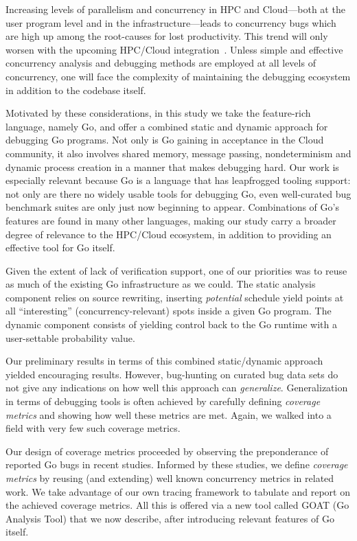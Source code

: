 
Increasing levels of parallelism and concurrency in HPC and Cloud---both
at the user program level and in the infrastructure---leads to concurrency
bugs which are high up among the root-causes for lost productivity.
%
This trend will only worsen with the upcoming HPC/Cloud
integration~\cite{dan-herbein-dong}.
%
%
Unless simple and effective concurrency analysis and
debugging methods are employed at all levels of
concurrency, one will face the complexity of maintaining
the debugging ecosystem in addition to the codebase itself.


Motivated by these considerations,
in this study we take the feature-rich language, namely Go,
and offer a combined static and dynamic approach for debugging
Go programs.
%
Not only is Go gaining in acceptance in the Cloud community,
it also involves shared memory, message passing, nondeterminism
and dynamic process creation in a manner that makes debugging hard.
%
Our work is especially relevant
because Go is a language that has leapfrogged tooling support: not only
are there no widely usable tools for debugging Go, even well-curated
bug benchmark suites are only just now beginning to appear.
%
%
Combinations of Go's features are found in many other languages,
making our study carry a broader degree of relevance
to the HPC/Cloud ecosystem, in addition to providing an effective
tool for Go itself.


Given the extent of lack of verification support, one of
our priorities was to reuse as much of the existing Go infrastructure
as we could.
%
The static analysis component relies on source rewriting, inserting
{\em potential} schedule yield points 
at all
``interesting'' (concurrency-relevant) spots inside a given Go program.
%
The dynamic component consists of yielding control back
to the Go runtime with a user-settable probability value.


Our preliminary results in terms of this combined static/dynamic
approach yielded encouraging results.
%
However, bug-hunting on curated bug data sets do not give any
indications on how well this approach can {\em generalize}.
%
Generalization in terms of debugging tools is often achieved
by carefully defining {\em coverage metrics} and showing how
well these metrics are met.
%
Again, we walked into a field with very few such coverage metrics.


Our design of coverage metrics proceeded
by observing the preponderance
of reported Go bugs in recent studies.
%
Informed by these studies,
we define {\em coverage metrics} by reusing
(and extending)
well known concurrency metrics in related work.
%
We take advantage of our own tracing framework to
tabulate and report on the achieved coverage metrics.
%
All this is offered via a new tool called GOAT (Go Analysis Tool)
that we now describe, after introducing relevant features of Go
itself.

